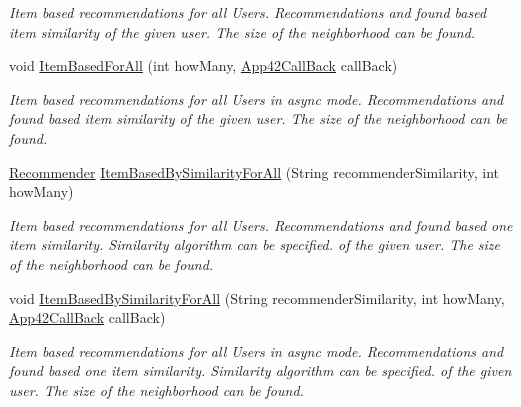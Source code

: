 \begin{DoxyCompactItemize}
\begin{DoxyCompactList}\small\item\em Item based recommendations for all Users. Recommendations and found based item similarity of the given user. The size of the neighborhood can be found. \end{DoxyCompactList}\item 
void \hyperlink{classcom_1_1shephertz_1_1app42_1_1paas_1_1sdk_1_1csharp_1_1recommend_1_1_recommender_service_a2e16f73958f49b19e5ba7e22ba5c6fbe}{Item\+Based\+For\+All} (int how\+Many, \hyperlink{interfacecom_1_1shephertz_1_1app42_1_1paas_1_1sdk_1_1csharp_1_1_app42_call_back}{App42\+Call\+Back} call\+Back)
\begin{DoxyCompactList}\small\item\em Item based recommendations for all Users in async mode. Recommendations and found based item similarity of the given user. The size of the neighborhood can be found. \end{DoxyCompactList}\item 
\hyperlink{classcom_1_1shephertz_1_1app42_1_1paas_1_1sdk_1_1csharp_1_1recommend_1_1_recommender}{Recommender} \hyperlink{classcom_1_1shephertz_1_1app42_1_1paas_1_1sdk_1_1csharp_1_1recommend_1_1_recommender_service_ae0bd71917cc7ab624e52e95261063618}{Item\+Based\+By\+Similarity\+For\+All} (String recommender\+Similarity, int how\+Many)
\begin{DoxyCompactList}\small\item\em Item based recommendations for all Users. Recommendations and found based one item similarity. Similarity algorithm can be specified. of the given user. The size of the neighborhood can be found. \end{DoxyCompactList}\item 
void \hyperlink{classcom_1_1shephertz_1_1app42_1_1paas_1_1sdk_1_1csharp_1_1recommend_1_1_recommender_service_a7c9023f1666c0b8867e3523412afebc6}{Item\+Based\+By\+Similarity\+For\+All} (String recommender\+Similarity, int how\+Many, \hyperlink{interfacecom_1_1shephertz_1_1app42_1_1paas_1_1sdk_1_1csharp_1_1_app42_call_back}{App42\+Call\+Back} call\+Back)
\begin{DoxyCompactList}\small\item\em Item based recommendations for all Users in async mode. Recommendations and found based one item similarity. Similarity algorithm can be specified. of the given user. The size of the neighborhood can be found. \end{DoxyCompactList}\item 

\end{DoxyCompactItemize}
